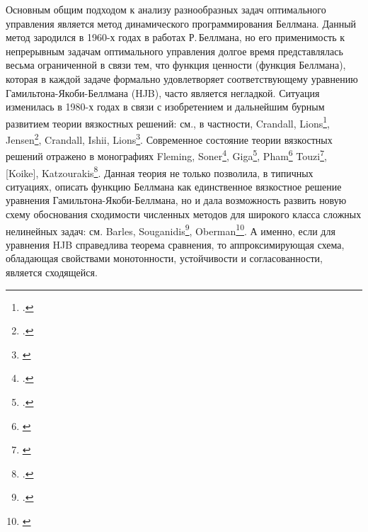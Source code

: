 \documentclass[twoside,12pt]{article}
\begin{document}
Основным общим подходом к анализу разнообразных задач оптимального управления является метод динамического программирования Беллмана. Данный метод зародился в 1960-х годах в работах Р.\,Беллмана, но его применимость к непрерывным задачам оптимального управления долгое время представлялась весьма ограниченной в связи тем, что функция ценности (функция Беллмана), которая в каждой задаче формально удовлетворяет соответствующему уравнению Гамильтона-Якоби-Беллмана (HJB), часто является негладкой.
Ситуация изменилась в 1980-х годах в связи с изобретением и дальнейшим бурным развитием теории вязкостных решений: см., в частности, Crandall, Lions\footcite{CraLio84}, Jensen\footcite{Jen89}, Crandall, Ishii, Lions\footnote{\label{CraIshLio} \cite{CraIshLio92}}. Современное состояние теории вязкостных решений отражено в монографиях Fleming, Soner\footcite{FleSon06}, Giga\footcite{Giga06}, Pham\footnote{\label{Pha} \cite{Pha09}} Touzi\footnote{\label{Tou} \cite{Tou13}}, [Koike], Katzourakis\footcite{Katz14}. Данная теория не только позволила, в типичных ситуациях, описать функцию Беллмана как единственное вязкостное решение уравнения Гамильтона-Якоби-Беллмана, но и дала возможность развить новую схему обоснования сходимости численных методов для широкого класса сложных нелинейных задач: см. Barles, Souganidis\footcite{BarSou91}, Oberman\footnote{\label{Obe} \cite{Obe06}}. А именно, если для уравнения HJB справедлива теорема сравнения, то аппроксимирующая схема, обладающая свойствами монотонности, устойчивости и согласованности, является сходящейся.
\end{document}
